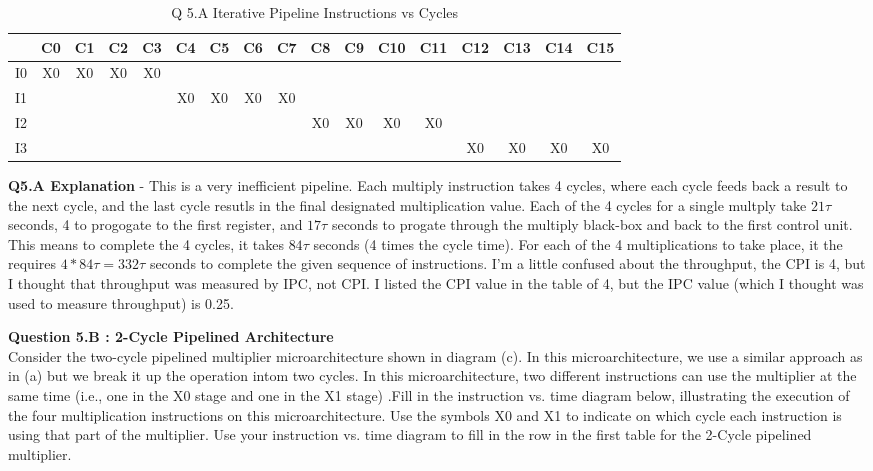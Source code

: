 \documentclass[a4paper,11pt]{article}
\begin{document}
\begin{table}[H]
\caption{Q 5.A Iterative Pipeline Instructions vs Cycles}
\begin{center}
\begin{tabular}{|c|c|c|c|c|c|c|c|c|c|c|c|c|c|c|c|c|} \hline
     & C0 & C1 & C2 & C3 & C4 & C5 & C6 & C7 & C8 & C9 & C10 & C11 & C12 & C13 & C14 & C15  \\ \hline
  I0 & X0 & X0 & X0 & X0 &    &    &    &    &    &     &     &     &     &     &    &      \\ \hline   
  I1 &    &    &    &    & X0 & X0 & X0 & X0 &    &     &     &     &     &     &    &      \\ \hline   
  I2 &    &    &    &    &    &    &    &    & X0 & X0  &  X0 & X0  &     &     &    &      \\ \hline   
  I3 &    &    &    &    &    &    &    &    &    &     &     &     & X0  &  X0 & X0 & X0   \\ \hline   
\end{tabular}
\end{center}
\end{table}

\textbf{Q5.A Explanation} - This is a very inefficient pipeline. Each multiply instruction takes 4 cycles, where each cycle feeds back a result to the next cycle, and the last cycle resutls in the final designated multiplication value. Each of the 4 cycles for a single multply take $21\tau$ seconds, 4 to progogate to the first register, and $17\tau$ seconds to progate through the multiply black-box and back to the first control unit. This means to complete the 4 cycles, it takes $84\tau$ seconds (4 times the cycle time). For each of the 4 multiplications to take place, it the requires $4*84\tau = 332\tau$ seconds to complete the given sequence of instructions. I'm a little confused about the throughput, the CPI is 4, but I thought that throughput was measured by IPC, not CPI. I listed the CPI value in the table of 4, but the IPC value (which I thought was used to measure throughput) is 0.25.

\item \textbf{Question 5.B : 2-Cycle Pipelined Architecture} \\
  Consider the two-cycle pipelined multiplier microarchitecture shown in diagram (c). In this microarchitecture, we use a similar approach as in (a) but we break it up the operation intom two cycles. In this microarchitecture, two different instructions can use the multiplier at the same time (i.e., one in the X0 stage and one in the X1 stage) .Fill in the instruction vs. time diagram below, illustrating the execution of the four multiplication  instructions on this microarchitecture. Use the symbols X0 and X1 to indicate on which cycle each instruction is using that part of the multiplier. Use your instruction vs. time diagram to fill in the row in the first table for the 2-Cycle pipelined multiplier. \\
\end{document}
